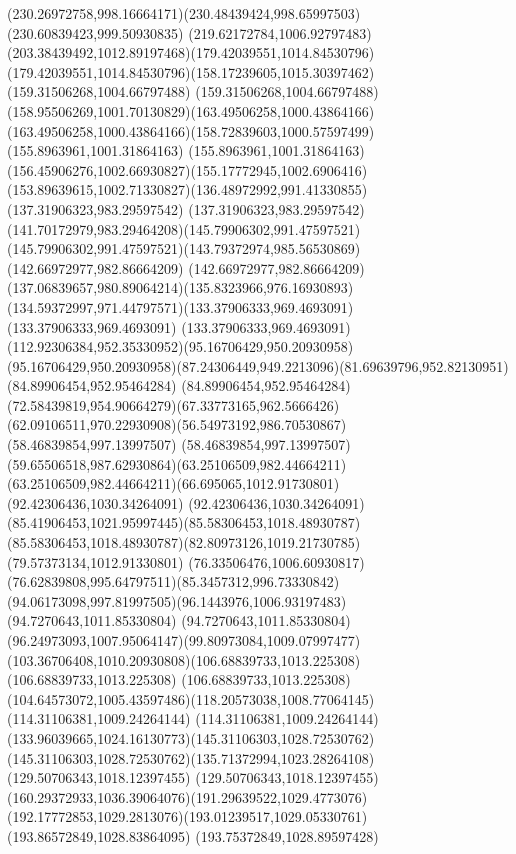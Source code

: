 {{\curveto(230.26972758,998.16664171)(230.48439424,998.65997503)(230.60839423,999.50930835)
\curveto(219.62172784,1006.92797483)(203.38439492,1012.89197468)(179.42039551,1014.84530796)
\curveto(179.42039551,1014.84530796)(158.17239605,1015.30397462)(159.31506268,1004.66797488)
\curveto(159.31506268,1004.66797488)(158.95506269,1001.70130829)(163.49506258,1000.43864166)
\curveto(163.49506258,1000.43864166)(158.72839603,1000.57597499)(155.8963961,1001.31864163)
\curveto(155.8963961,1001.31864163)(156.45906276,1002.66930827)(155.17772945,1002.6906416)
\curveto(153.89639615,1002.71330827)(136.48972992,991.41330855)(137.31906323,983.29597542)
\curveto(137.31906323,983.29597542)(141.70172979,983.29464208)(145.79906302,991.47597521)
\curveto(145.79906302,991.47597521)(143.79372974,985.56530869)(142.66972977,982.86664209)
\curveto(142.66972977,982.86664209)(137.06839657,980.89064214)(135.8323966,976.16930893)
\curveto(134.59372997,971.44797571)(133.37906333,969.4693091)(133.37906333,969.4693091)
\curveto(133.37906333,969.4693091)(112.92306384,952.35330952)(95.16706429,950.20930958)
\curveto(95.16706429,950.20930958)(87.24306449,949.2213096)(81.69639796,952.82130951)
\lineto(84.89906454,952.95464284)
\curveto(84.89906454,952.95464284)(72.58439819,954.90664279)(67.33773165,962.5666426)
\curveto(62.09106511,970.22930908)(56.54973192,986.70530867)(58.46839854,997.13997507)
\curveto(58.46839854,997.13997507)(59.65506518,987.62930864)(63.25106509,982.44664211)
\curveto(63.25106509,982.44664211)(66.695065,1012.91730801)(92.42306436,1030.34264091)
\curveto(92.42306436,1030.34264091)(85.41906453,1021.95997445)(85.58306453,1018.48930787)
\curveto(85.58306453,1018.48930787)(82.80973126,1019.21730785)(79.57373134,1012.91330801)
\curveto(76.33506476,1006.60930817)(76.62839808,995.64797511)(85.3457312,996.73330842)
\curveto(94.06173098,997.81997505)(96.1443976,1006.93197483)(94.7270643,1011.85330804)
\curveto(94.7270643,1011.85330804)(96.24973093,1007.95064147)(99.80973084,1009.07997477)
\curveto(103.36706408,1010.20930808)(106.68839733,1013.225308)(106.68839733,1013.225308)
\curveto(106.68839733,1013.225308)(104.64573072,1005.43597486)(118.20573038,1008.77064145)
\lineto(114.31106381,1009.24264144)
\curveto(114.31106381,1009.24264144)(133.96039665,1024.16130773)(145.31106303,1028.72530762)
\curveto(145.31106303,1028.72530762)(135.71372994,1023.28264108)(129.50706343,1018.12397455)
\curveto(129.50706343,1018.12397455)(160.29372933,1036.39064076)(191.29639522,1029.4773076)
\curveto(192.17772853,1029.2813076)(193.01239517,1029.05330761)(193.86572849,1028.83864095)
\lineto(193.75372849,1028.89597428)
}}
